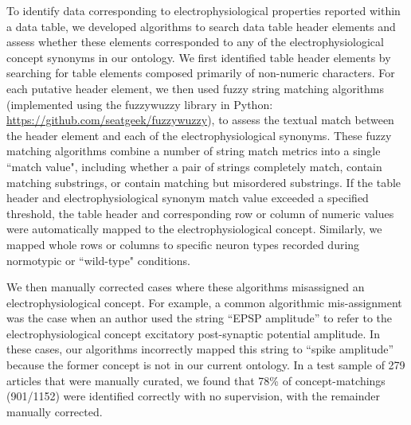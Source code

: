 \documentclass{template/frontiersSCNS} %
\begin{document}
To identify data corresponding to electrophysiological properties reported within a data table, we developed algorithms to search data table header elements and assess whether these elements corresponded to any of the electrophysiological concept synonyms in our ontology.  
We first identified table header elements by searching for table elements composed primarily of non-numeric characters.  
For each putative header element, we then used fuzzy string matching algorithms (implemented using the fuzzywuzzy library in Python: \url{https://github.com/seatgeek/fuzzywuzzy}), to assess the textual match between the header element and each of the electrophysiological synonyms.  
These fuzzy matching algorithms combine a number of string match metrics into a single ``match value", including whether a pair of strings completely match, contain matching substrings, or contain matching but misordered substrings.  
If the table header and electrophysiological synonym match value exceeded a specified threshold, the table header and corresponding row or column of numeric values were automatically mapped to the electrophysiological concept.  
Similarly, we mapped whole rows or columns to specific neuron types recorded during normotypic or ``wild-type" conditions.

We then manually corrected cases where these algorithms misassigned an electrophysiological concept.  
For example, a common algorithmic mis-assignment was the case when an author used the string ``EPSP amplitude'' to refer to the electrophysiological concept excitatory post-synaptic potential amplitude.  
In these cases, our algorithms incorrectly mapped this string to ``spike amplitude'' because the former concept is not in our current ontology.  
In a test sample of 279 articles that were manually curated, we found that 78\% of concept-matchings (901/1152) were identified correctly with no supervision, with the remainder manually corrected.  
\end{document}
